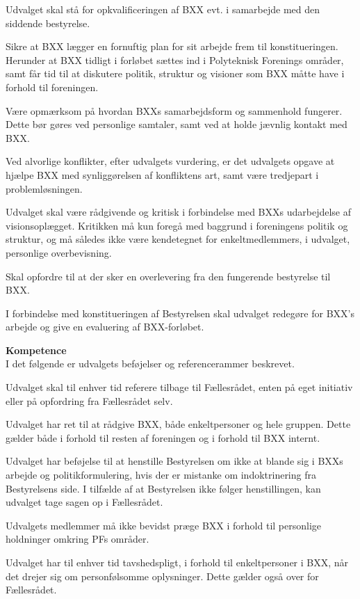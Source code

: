 \begin{list}{•}
\item Udvalget skal stå for opkvalificeringen af BXX evt. i samarbejde med den siddende bestyrelse.
\item Sikre at BXX lægger en fornuftig plan for sit arbejde frem til konstitueringen. Herunder at BXX tidligt i forløbet sættes ind i Polyteknisk Forenings områder, samt får tid til at diskutere politik, struktur og visioner som BXX måtte have i forhold til foreningen.
\item Være opmærksom på hvordan BXXs samarbejdsform og sammenhold fungerer. Dette bør gøres ved personlige
        samtaler, samt ved at holde jævnlig kontakt med BXX.
\item Ved alvorlige konflikter, efter udvalgets vurdering, er det udvalgets opgave at hjælpe BXX med synliggørelsen
     af konfliktens art, samt være tredjepart i problemløsningen.
\item Udvalget skal være rådgivende og kritisk i forbindelse med BXXs udarbejdelse af visionsoplægget. Kritikken
      må kun foregå med baggrund i foreningens politik og struktur, og må således ikke være kendetegnet for
          enkeltmedlemmers, i udvalget, personlige overbevisning.
\item Skal opfordre til at der sker en overlevering fra den fungerende bestyrelse til BXX.
\item I forbindelse med konstitueringen af Bestyrelsen skal udvalget redegøre for BXX’s arbejde og give en
      evaluering af BXX-forløbet.
\end{list}
\textbf{Kompetence}\\
I det følgende er udvalgets beføjelser og referencerammer beskrevet.
\begin{list}{•}
\item Udvalget skal til enhver tid referere tilbage til Fællesrådet, enten på eget initiativ eller på opfordring fra Fællesrådet
         selv.
\item Udvalget har ret til at rådgive BXX, både enkeltpersoner og hele gruppen. Dette gælder både i forhold til resten af
       foreningen og i forhold til BXX internt.
\item Udvalget har beføjelse til at henstille Bestyrelsen om ikke at blande sig i BXXs arbejde og politikformulering, hvis
    der er mistanke om indoktrinering fra Bestyrelsens side. I tilfælde af at Bestyrelsen ikke følger henstillingen, kan
     udvalget tage sagen op i Fællesrådet.
\item Udvalgets medlemmer må ikke bevidst præge BXX i forhold til personlige holdninger omkring PFs områder.
\item      Udvalget har til enhver tid tavshedspligt, i forhold til enkeltpersoner i BXX, når det drejer sig om personfølsomme
     oplysninger. Dette gælder også over for Fællesrådet.  
\end{list}


